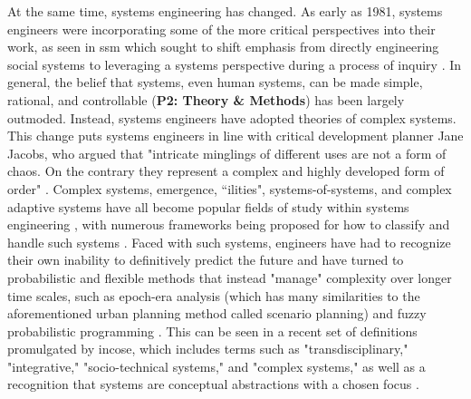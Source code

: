 At the same time, systems engineering has changed.  As early as 1981, systems engineers were incorporating some of the more critical perspectives into their work, as seen in \ac{ssm} which sought to shift emphasis from directly engineering social systems to leveraging a systems perspective during a process of inquiry \cite{checklandSystemsThinkingSystems1999}. In general, the belief that systems, even human systems, can be made simple, rational, and controllable (\textbf{P2: Theory \& Methods}) has been largely outmoded. Instead, systems engineers have adopted theories of complex systems. This change puts systems engineers in line with critical development planner Jane Jacobs, who argued that "intricate minglings of different uses are not a form of chaos. On the contrary they represent a complex and highly developed form of order" \cite{jacobsDeathLifeGreat2016}. Complex systems, emergence, ``ilities", systems-of-systems, and complex adaptive systems have all become popular fields of study within systems engineering \cite{mcdermidComplexityConceptCauses2000, sussmanCollectedViewsComplexity2002, chenComplexityEmergenceEngineering2009, deguetElementsEmergenceIssue2006, officeofthedirectorofsystemsandsoftwareengineeringSystemsEngineeringGuide2008, glassComplexAdaptiveSystems2011, incosecomplexsystemsworkinggroupComplexityPrimerSystems2016, keatingSystemsSystemsEngineering2011, mittalHumanLoopSystem2015, sheardPracticalApplicationsComplexity2005, tolkResearchAgendaSupport2015}, with numerous frameworks being proposed for how to classify and handle such systems \cite{kurtzNewDynamicsStrategy2003, martinFrameworkQuantifyingComplexity2004, sheardComplexityTypologySystems2010, righiCharacterizingComplexitySociotechnical2012, schottlQuantifyingComplexitySocioTechnical2015, reymondetFrameworkSenseMakingComplex2016}. Faced with such systems, engineers have had to recognize their own inability to definitively predict the future and have turned to probabilistic and flexible methods that instead "manage" complexity over longer time scales, such as epoch-era analysis \cite{rossUsingNaturalValueCentric2008, vascikMethodExploringProgram2015} (which has many similarities to the aforementioned urban planning method called scenario planning) and fuzzy probabilistic programming \cite{zhangRobustStochasticFuzzy2009, liuInexactStochasticFuzzy2015}. This can be seen in a recent set of definitions promulgated by \ac{incose}, which includes terms such as "transdisciplinary," "integrative," "socio-technical systems," and "complex systems," as well as a recognition that systems are conceptual abstractions with a chosen focus \cite{sillittoSystemsEngineeringSystem2019}. 


